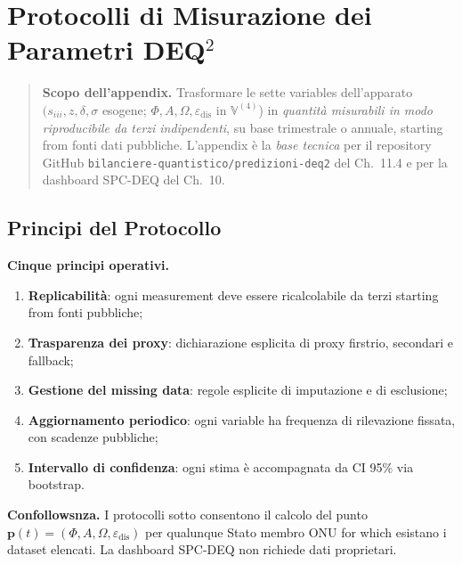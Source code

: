 \chapter{Protocolli di Misurazione dei Parametri
DEQ$^2$}\label{protocolli-di-measurement-dei-parameters-dequxb2}

\begin{quote}
\textbf{Scopo dell'appendix.} Trasformare le sette variables
dell'apparato \((s_{iii}, z, \delta, \sigma\) esogene;
\(\Phi, A, \Omega, \varepsilon_{\text{dis}}\) in \(\mathbb{V}^{(4)}\))
in \emph{quantità misurabili in modo riproducibile da terzi
indipendenti}, su base trimestrale o annuale, starting from fonti dati
pubbliche. L'appendix è la \emph{base tecnica} per il repository GitHub
\texttt{bilanciere-quantistico/predizioni-deq2} del Ch.~11.4 e per la
dashboard SPC-DEQ del Ch.~10.
\end{quote}



\section{Principi del Protocollo}\label{principi-del-protocollo}

\Hypoth{} \textbf{Cinque principi operativi.}

\begin{enumerate}
\def\labelenumi{\arabic{enumi}.}
\tightlist
\item
  \textbf{Replicabilità}: ogni measurement deve essere ricalcolabile da
  terzi starting from fonti pubbliche;
\item
  \textbf{Trasparenza dei proxy}: dichiarazione esplicita di proxy
  firstrio, secondari e fallback;
\item
  \textbf{Gestione del missing data}: regole esplicite di imputazione e
  di esclusione;
\item
  \textbf{Aggiornamento periodico}: ogni variable ha frequenza di
  rilevazione fissata, con scadenze pubbliche;
\item
  \textbf{Intervallo di confidenza}: ogni stima è accompagnata da CI
  95\% via bootstrap.
\end{enumerate}

\Proved{} \textbf{Confollowsnza.} I protocolli sotto consentono il calcolo
del punto
\(\boldsymbol{p}(t) = (\Phi, A, \Omega, \varepsilon_{\text{dis}})\) per
qualunque Stato membro ONU for which esistano i dataset elencati. La
dashboard SPC-DEQ non richiede dati proprietari.



